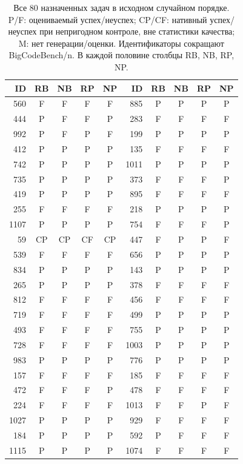 \begin{table}[htbp]\centering\scriptsize
\caption{Все 80 назначенных задач в исходном случайном порядке. P/F: оцениваемый успех/неуспех; CP/CF: нативный успех/неуспех при непригодном контроле, вне статистики качества; M: нет генерации/оценки. Идентификаторы сокращают BigCodeBench/n. В каждой половине столбцы RB, NB, RP, NP.}\label{tab:seg80-all}
\begin{tabular*}{\linewidth}{@{\extracolsep{\fill}}rccccrcccc}\toprule
ID & RB & NB & RP & NP & ID & RB & NB & RP & NP\\\midrule
560 & F & F & F & F & 885 & P & P & P & P\\
444 & P & F & F & P & 283 & F & F & F & F\\
992 & P & F & P & F & 199 & P & P & P & P\\
412 & P & P & P & P & 135 & F & F & F & F\\
742 & P & P & P & P & 1011 & P & P & P & P\\
735 & P & P & P & P & 373 & F & F & F & P\\
419 & P & P & P & P & 895 & F & F & F & F\\
255 & F & F & F & F & 218 & P & P & P & P\\
1107 & P & P & P & P & 754 & F & F & F & P\\
59 & CP & CP & CF & CP & 447 & F & P & P & F\\
539 & F & F & F & F & 656 & P & P & P & P\\
834 & P & P & P & P & 143 & P & P & P & P\\
265 & P & P & P & P & 378 & F & F & F & F\\
812 & F & F & F & F & 456 & F & F & F & F\\
719 & F & F & F & F & 499 & P & P & P & P\\
493 & F & F & F & F & 755 & P & P & P & P\\
728 & F & F & F & F & 1003 & P & P & P & P\\
983 & P & P & P & P & 776 & P & P & P & P\\
157 & F & F & F & F & 185 & F & F & F & F\\
472 & F & F & F & P & 478 & F & F & F & F\\
224 & F & F & F & F & 1013 & F & F & P & F\\
1027 & P & P & P & P & 929 & F & F & F & F\\
184 & P & P & P & P & 592 & P & F & F & F\\
1115 & P & P & P & P & 1074 & F & F & F & F\\

\end{tabular*}
\end{table}
